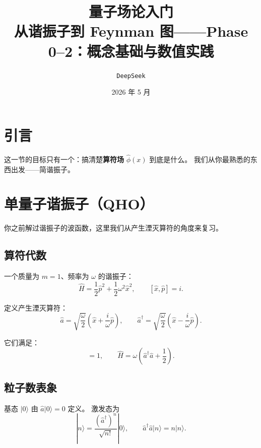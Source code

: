 \documentclass[12pt,a4paper]{article}
\title{\vspace{-2em}\textbf{量子场论入门}\\
\large 从谐振子到 Feynman 图——Phase 0--2：概念基础与数值实践}
\author{\texttt{DeepSeek}}
\date{2026 年 5 月}
\begin{document}
\maketitle
\vspace{-1em}

\section{引言}

这一节的目标只有一个：搞清楚\textbf{算符场} $\hat\phi(x)$ 到底是什么。
我们从你最熟悉的东西出发——简谐振子。

\section{单量子谐振子（QHO）}

你之前解过谐振子的波函数，这里我们从产生湮灭算符的角度来复习。

\subsection{算符代数}

一个质量为 $m=1$、频率为 $\omega$ 的谐振子：
\begin{equation}
\hat H = \frac{1}{2}\hat p^2 + \frac{1}{2}\omega^2 \hat x^2,
\qquad [\hat x, \hat p] = i.
\label{eq:qho-ham}
\end{equation}

定义产生湮灭算符：
\begin{equation}
\hat a = \sqrt{\frac{\omega}{2}}\left(\hat x + \frac{i}{\omega}\hat p\right),\qquad
\hat a^\dagger = \sqrt{\frac{\omega}{2}}\left(\hat x - \frac{i}{\omega}\hat p\right).
\label{eq:annihilation}
\end{equation}

它们满足：
\begin{equation}
[\hat a, \hat a^\dagger] = 1,
\qquad
\hat H = \omega\left(\hat a^\dagger \hat a + \frac12\right).
\label{eq:qho-comm}
\end{equation}

\subsection{粒子数表象}

基态 $|0\rangle$ 由 $\hat a|0\rangle = 0$ 定义。
激发态为
\begin{equation}
|n\rangle = \frac{(\hat a^\dagger)^n}{\sqrt{n!}}|0\rangle,
\qquad
\hat a^\dagger \hat a |n\rangle = n|n\rangle.
\label{eq:fock-state}
\end{equation}
\end{document}
